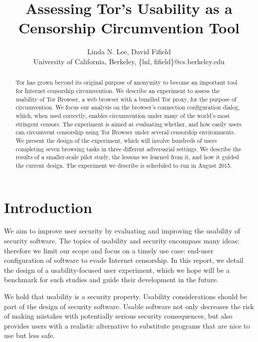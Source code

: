 \documentclass[letterpaper,twocolumn,11pt]{article}
\begin{document}
\title{Assessing Tor's Usability as a Censorship Circumvention Tool}
\author{Linda N. Lee, David Fifield\\
University of California, Berkeley, \{lnl, fifield\}@cs.berkeley.edu
}
\maketitle
 
\begin{abstract}
\indent \indent Tor has grown beyond its original purpose of anonymity
to become an important tool for
Internet censorship circumvention.
We describe an experiment to assess the usability of Tor Browser,
a web browser with a bundled Tor proxy,
for the purpose of circumvention.
We focus our analysis on the browser's connection configuration dialog, which,
when used correctly,
enables circumvention under many of the world's most stringent censors.
The experiment is aimed at evaluating whether, and how easily users can circumvent censorship using Tor Browser
under several censorship environments.
We present the design of the experiment,
which will involve hundreds of users completing seven browsing tasks in three different adversarial settings.
We describe the results of a smaller-scale pilot study,
the lessons we learned from it,
and how it guided the current design.
The experiment we describe is scheduled to run in August 2015.
\end{abstract}

\section{Introduction}

\indent \indent We aim to improve user security by evaluating
and improving the usability of security software.
The topics of usability and security encompass many ideas;
therefore we limit our scope and focus on
a timely use case:
end-user configuration of software to evade Internet censorship.
In this report, we detail the design of a usability-focused user experiment,
which we hope will be a benchmark for such studies
and guide their development in the future.

We hold that usability is a security property.
Usability considerations should be part of the design of security software.
Usable software not only decreases the risk of making mistakes
with potentially serious security consequences,
but also provides users with a realistic alternative to
substitute programs that are nice to use but less safe.
\end{document}
